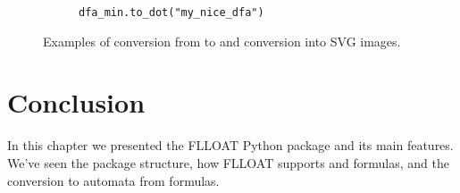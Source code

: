 \begin{figure}[h]
\begin{subfigure}[b]{0.40\textwidth}
		\caption{\texttt{dfa\_min.to\_dot("my\_nice\_dfa")}}
		\label{fig:flloat-to_automaton-example-my-nice-dfa}
	\end{subfigure}
	\caption{Examples of conversion from \LLf to \DFA and conversion into SVG images.}
\end{figure}

\section{Conclusion}
In this chapter we presented the FLLOAT Python package and its main features. We've seen the package structure, how FLLOAT supports \PL and \LLf formulas, and the conversion to automata from \LLf formulas.
